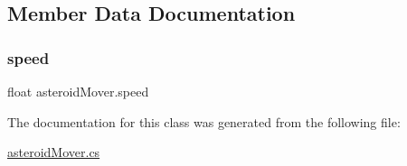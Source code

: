 \subsection{Member Data Documentation}
\mbox{\label{classasteroid_mover_a1e23da1a73200fd4f129e5de86bdf32c}} 
\subsubsection{\texorpdfstring{speed}{speed}}
{\footnotesize\ttfamily float asteroid\+Mover.\+speed\hspace{0.3cm}{\ttfamily [private]}}



The documentation for this class was generated from the following file\+:\begin{DoxyCompactItemize}
\item 
\mbox{\hyperlink{asteroid_mover_8cs}{asteroid\+Mover.\+cs}}\end{DoxyCompactItemize}
